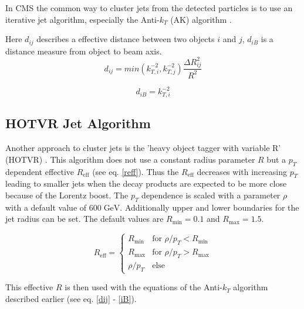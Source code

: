 	
	In CMS the common way to cluster jets from the detected particles is to use an iterative jet algorithm, especially the Anti-$k_T$ (AK) algorithm \cite{antikt}.
	
	Here $d_{ij}$ describes a effective distance between two objects $i$ and $j$, $d_{iB}$ is a distance measure from object to beam axis.
	\begin{equation}
	d_{ij} = min (k_{T,i}^{-2}, k_{T,j}^{-2})  \frac{\Delta R_{ij}^2}{R^2}
	\label{dij}
	\end{equation}
	
	\begin{equation}
	d_{iB} = k_{T,i}^{-2}
	\label{iB}
	\end{equation}
	

\subsection{HOTVR Jet Algorithm}
	Another approach to cluster jets is the 'heavy object tagger with variable R' (HOTVR) \cite{hotvr}. This algorithm does not use a constant radius parameter $R$ but a $p_T$ dependent effective $R_\text{eff}$ (see eq. \ref{reff}). Thus the $R_\text{eff}$ decreases with increasing $p_T$ leading to smaller jets when the decay products are expected to be more close because of the Lorentz boost. The $p_T$ dependence is scaled with a parameter $\rho$ with a default value of $600\;\text{GeV}$. Additionally upper and lower boundaries for the jet radius can be set. The default values are $R_\text{min} = 0.1$ and $R_\text{max} = 1.5$.
	
	\begin{equation}
	\label{reff}
	  R_\text{eff} =
	   \begin{cases}
	     R_\text{min} & \text{for } \rho / p_T < R_\text{min} \\
	     R_\text{max} & \text{for } \rho / p_T > R_\text{max} \\
	     \rho / p_T & \text{else}  
	   \end{cases}
	\end{equation}
	
	\noindent This effective $R$ is then used with the equations of the Anti-$k_T$ algorithm described earlier (see eq. \ref{dij} - \ref{iB}).

